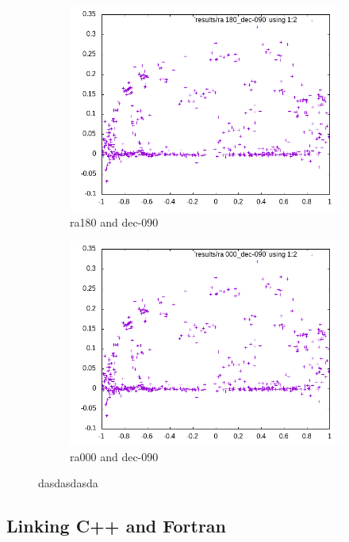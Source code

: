 \begin{figure}[!htb]
	\begin{subfigure}[b]{0.5\textwidth}
		\includegraphics[width=\linewidth]{images/ch4/ra180_dec-090.png}
		\caption{ra180 and dec-090}
	\end{subfigure}
	\hfill
	\begin{subfigure}[b]{0.5\textwidth}
		\includegraphics[width=\linewidth]{images/ch4/ra000_dec-090.png}
		\caption{ra000 and dec-090}
	\end{subfigure}
	\caption{dasdasdasda}
	\label{fig:poles}
\end{figure}


\subsection{Linking C++ and Fortran}

